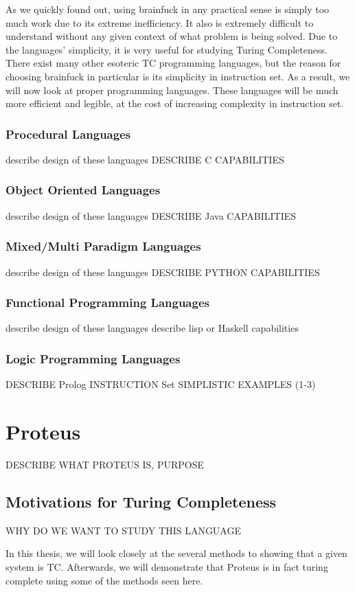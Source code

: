 As we quickly found out, using brainfuck in any practical sense is simply too much work due to its extreme inefficiency.
It also is extremely difficult to understand without any given context of what problem is being solved.
Due to the languages' simplicity, it is very useful for studying Turing Completeness.
There exist many other esoteric TC programming languages, but the reason for choosing brainfuck in particular is its simplicity in instruction set.
As a result, we will now look at proper programming languages.
These languages will be much more efficient and legible, at the cost of increasing complexity in instruction set.

\subsubsection{Procedural Languages}

describe design of these languages
DESCRIBE C CAPABILITIES

\subsubsection{Object Oriented Languages}

describe design of these languages
DESCRIBE Java CAPABILITIES

\subsubsection{Mixed/Multi Paradigm Languages}

describe design of these languages
DESCRIBE PYTHON CAPABILITIES

\subsubsection{Functional Programming Languages}

describe design of these languages
describe lisp or Haskell capabilities

\subsubsection{Logic Programming Languages}

DESCRIBE Prolog INSTRUCTION Set
SIMPLISTIC EXAMPLES (1-3)

\section{Proteus}

DESCRIBE WHAT PROTEUS IS, PURPOSE

\subsection{Motivations for Turing Completeness}

WHY DO WE WANT TO STUDY THIS LANGUAGE


In this thesis, we will look closely at the several methods to showing that a given system is TC.
Afterwards, we will demonstrate that Proteus is in fact turing complete using some of the methods seen here.